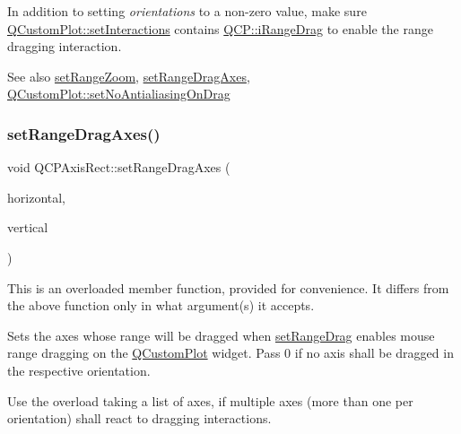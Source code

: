 In addition to setting {\itshape orientations} to a non-\/zero value, make sure \mbox{\hyperlink{class_q_custom_plot_a5ee1e2f6ae27419deca53e75907c27e5}{Q\+Custom\+Plot\+::set\+Interactions}} contains \mbox{\hyperlink{namespace_q_c_p_a2ad6bb6281c7c2d593d4277b44c2b037a2c4432b9aceafb94000be8d1b589ef18}{Q\+C\+P\+::i\+Range\+Drag}} to enable the range dragging interaction.

\begin{DoxySeeAlso}{See also}
\mbox{\hyperlink{class_q_c_p_axis_rect_a7960a9d222f1c31d558b064b60f86a31}{set\+Range\+Zoom}}, \mbox{\hyperlink{class_q_c_p_axis_rect_a648cce336bd99daac4a5ca3e5743775d}{set\+Range\+Drag\+Axes}}, \mbox{\hyperlink{class_q_custom_plot_a775bdcb6329d44701aeaa6135b0e5265}{Q\+Custom\+Plot\+::set\+No\+Antialiasing\+On\+Drag}} 
\end{DoxySeeAlso}
\mbox{\label{class_q_c_p_axis_rect_a648cce336bd99daac4a5ca3e5743775d}} 
\subsubsection{\texorpdfstring{setRangeDragAxes()}{setRangeDragAxes()}\hspace{0.1cm}{\footnotesize\ttfamily [1/3]}}
{\footnotesize\ttfamily void Q\+C\+P\+Axis\+Rect\+::set\+Range\+Drag\+Axes (\begin{DoxyParamCaption}\item[{\mbox{\hyperlink{class_q_c_p_axis}{Q\+C\+P\+Axis}} $\ast$}]{horizontal,  }\item[{\mbox{\hyperlink{class_q_c_p_axis}{Q\+C\+P\+Axis}} $\ast$}]{vertical }\end{DoxyParamCaption})}

This is an overloaded member function, provided for convenience. It differs from the above function only in what argument(s) it accepts.

Sets the axes whose range will be dragged when \mbox{\hyperlink{class_q_c_p_axis_rect_ae6aef2f7211ba6097c925dcd26008418}{set\+Range\+Drag}} enables mouse range dragging on the \mbox{\hyperlink{class_q_custom_plot}{Q\+Custom\+Plot}} widget. Pass 0 if no axis shall be dragged in the respective orientation.

Use the overload taking a list of axes, if multiple axes (more than one per orientation) shall react to dragging interactions.

